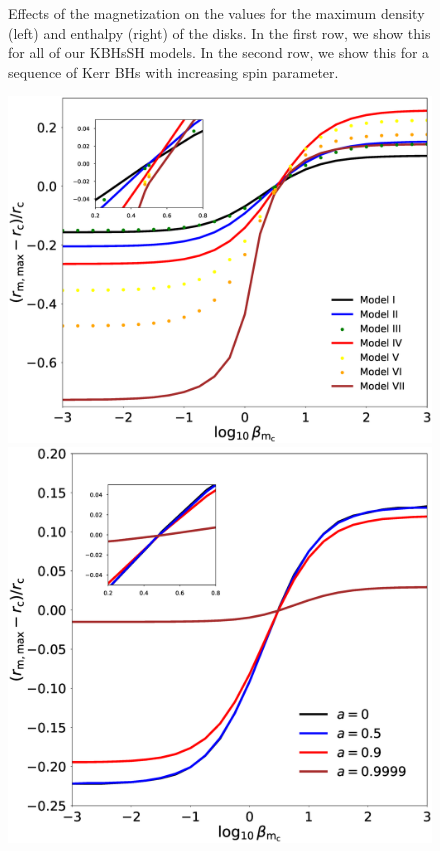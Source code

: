 \documentclass[twocolumn,aps,showpacs,showkeys,prd,superscriptaddress,byrevtex, amsmath]{revtex4-1}
\begin{document}
\begin{figure}
\hspace{-0.cm}
\caption{Effects of the magnetization on the values for the maximum density (left) and enthalpy (right) of the disks. In the first row, we show this for all of our KBHsSH models. In the second row, we show this for a sequence of Kerr BHs with increasing spin parameter. }
\label{comparison_HBH_Kerr_dens_enth}
\end{figure}

\begin{figure}
\centering
\includegraphics[scale=0.2]{figures/fig8_HBH.eps}
\hspace{0.5cm}
\includegraphics[scale=0.2]{figures/fig8_Kerr.eps}

\end{figure}
\end{document}
